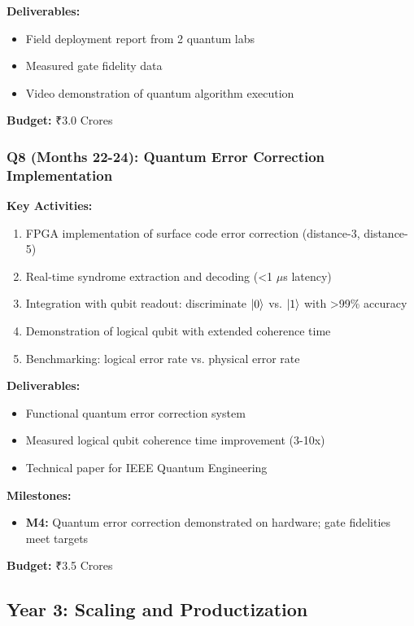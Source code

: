 \documentclass[12pt,a4paper]{article}
\begin{document}
\begin{enumerate}[leftmargin=*]
\textbf{Deliverables:}
\begin{itemize}[leftmargin=*]
    \item Field deployment report from 2 quantum labs
    \item Measured gate fidelity data
    \item Video demonstration of quantum algorithm execution
\end{itemize}

\textbf{Budget:} ₹3.0 Crores

\subsubsection{Q8 (Months 22-24): Quantum Error Correction Implementation}

\textbf{Key Activities:}
\begin{enumerate}[leftmargin=*]
    \item FPGA implementation of surface code error correction (distance-3, distance-5)
    \item Real-time syndrome extraction and decoding (<1 $\mu$s latency)
    \item Integration with qubit readout: discriminate $\ket{0}$ vs. $\ket{1}$ with >99\% accuracy
    \item Demonstration of logical qubit with extended coherence time
    \item Benchmarking: logical error rate vs. physical error rate
\end{enumerate}

\textbf{Deliverables:}
\begin{itemize}[leftmargin=*]
    \item Functional quantum error correction system
    \item Measured logical qubit coherence time improvement (3-10x)
    \item Technical paper for IEEE Quantum Engineering
\end{itemize}

\textbf{Milestones:}
\begin{itemize}[leftmargin=*]
    \item \textbf{M4:} Quantum error correction demonstrated on hardware; gate fidelities meet targets
\end{itemize}

\textbf{Budget:} ₹3.5 Crores

\subsection{Year 3: Scaling and Productization}


\end{enumerate}
\end{document}
